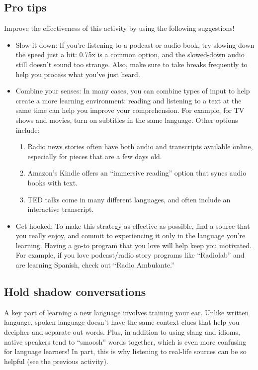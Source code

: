 \documentclass[../main.tex]{subfiles}
\begin{document}
\subsection{Pro tips}
Improve the effectiveness of this activity by using the following suggestions!
%
\begin{itemize}
  \item Slow it down: If you’re listening to a podcast or audio book, try
    slowing down the speed just a bit: 0.75x is a common option, and the
    slowed-down audio still doesn’t sound too strange. Also, make sure to take
    breaks frequently to help you process what you’ve just heard.
  \item Combine your senses: In many cases, you can combine types of input to
    help create a more learning environment: reading and listening to a text at
    the same time can help you improve your comprehension. For example, for TV
    shows and movies, turn on subtitles in the same language. Other options
    include:
    \begin{enumerate}
      \item Radio news stories often have both audio and transcripts available
        online, especially for pieces that are a few days old.
      \item Amazon’s Kindle offers an “immersive reading” option that syncs
        audio books with text.
      \item TED talks come in many different languages, and often include an
        interactive transcript.
    \end{enumerate}
  \item Get hooked: To make this strategy as effective as possible, find a
    source that you really enjoy, and commit to experiencing it only in the
    language you’re learning. Having a go-to program that you love will help
    keep you motivated. For example, if you love podcast/radio story programs
    like “Radiolab” and are learning Spanish, check out “Radio Ambulante.”
\end{itemize}
%
\subsection{Hold shadow conversations}
A key part of learning a new language involves training your ear. Unlike written
language, spoken language doesn’t have the same context clues that help you
decipher and separate out words. Plus, in addition to using slang and idioms,
native speakers tend to “smoosh” words together, which is even more confusing
for language learners! In part, this is why listening to real-life sources
can be so helpful (see the previous activity).
\end{document}
